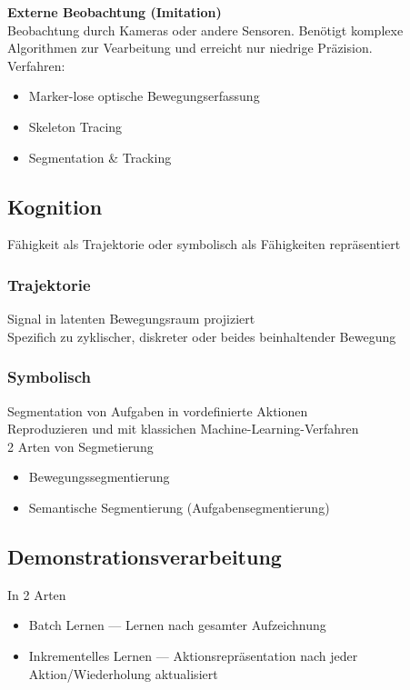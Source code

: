 \textbf{Externe Beobachtung (Imitation)}\\
Beobachtung durch Kameras oder andere Sensoren. Benötigt komplexe Algorithmen zur Vearbeitung und erreicht nur
niedrige Präzision.\\

Verfahren:
\begin{itemize}
\item Marker-lose optische Bewegungserfassung
\item Skeleton Tracing
\item Segmentation \& Tracking
\end{itemize}


\subsection{Kognition}
Fähigkeit als Trajektorie oder symbolisch als Fähigkeiten repräsentiert

\subsubsection{Trajektorie}
Signal in latenten Bewegungsraum projiziert\\
Spezifich zu zyklischer, diskreter oder beides beinhaltender Bewegung

\subsubsection{Symbolisch}
Segmentation von Aufgaben in vordefinierte Aktionen\\
Reproduzieren und mit klassichen Machine-Learning-Verfahren\\

2 Arten von Segmetierung
\begin{itemize}
\item Bewegungssegmentierung
\item Semantische Segmentierung (Aufgabensegmentierung)
\end{itemize}


\subsection{Demonstrationsverarbeitung}
In 2 Arten
\begin{itemize}
\item Batch Lernen --- Lernen nach gesamter Aufzeichnung
\item Inkrementelles Lernen --- Aktionsrepräsentation nach jeder Aktion/Wiederholung aktualisiert
\end{itemize}


